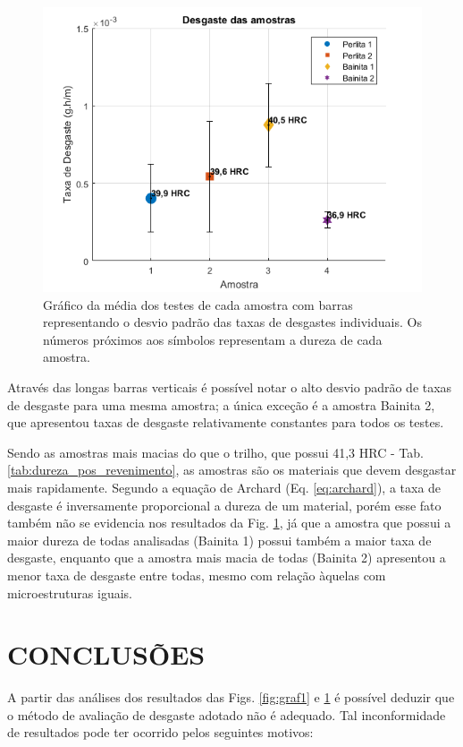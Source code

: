 \documentclass[
12pt,
openany, %
oneside, %
a4paper,			
english,			
brazil			        %
]{abntbibufjf}
\begin{document}
	\begin{figure}[H]
		\centering
		\includegraphics[width=1\textwidth]{graf2}
		\caption{Gráfico da média dos testes de cada amostra com barras representando o desvio padrão das taxas de desgastes individuais. Os números próximos aos símbolos representam a dureza de cada amostra.}
		\label{fig:graf2}
	\end{figure}

	Através das longas barras verticais é possível notar o alto desvio padrão de taxas de desgaste para uma mesma amostra; a única exceção é a amostra Bainita 2, que apresentou taxas de desgaste relativamente constantes para todos os testes.
	
	Sendo as amostras mais macias do que o trilho, que possui 41,3 HRC - Tab. \ref{tab:dureza_pos_revenimento}, as amostras são os materiais que devem desgastar mais rapidamente. Segundo a equação de Archard (Eq. \ref{eq:archard}), a taxa de desgaste é inversamente proporcional a dureza de um material, porém esse fato também não se evidencia nos resultados da Fig. \ref{fig:graf2}, já que a amostra que possui a maior dureza de todas analisadas (Bainita 1) possui também a maior taxa de desgaste, enquanto que a amostra mais macia de todas (Bainita 2) apresentou a menor taxa de desgaste entre todas, mesmo com relação àquelas com microestruturas iguais.

\chapter{CONCLUSÕES}
		A partir das análises dos resultados das Figs. \ref{fig:graf1} e \ref{fig:graf2} é possível deduzir que o método de avaliação de desgaste adotado não é adequado. Tal inconformidade de resultados pode ter ocorrido pelos seguintes motivos:
		
\end{document}
